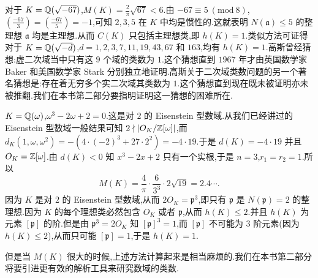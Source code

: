 \begin{example}
对于 $K=\mathbb{Q}(\sqrt{-67})$,$M(K)=\frac{2}{\pi}\sqrt{67}<6$.由 $-67\equiv 5\ (\mathrm{mod}\ 8)$,$\left(\frac{-67}{3}\right)=\left(\frac{-67}{5}\right)=-1$,可知 $2,3,5$ 在 $K$ 中均是惯性的.这就表明 $N(\mathfrak{a})\leqslant 5$ 的整理想 $\mathfrak{a}$ 均是主理想.从而 $C(K)$ 只包括主理想类,即 $h(K)=1$.类似方法可证得对于 $K=\mathbb{Q}(\sqrt{-d})$,$d=1,2,3,7,11,19,43,67$ 和 $163$,均有 $h(K)=1$.高斯曾经猜想:虚二次域当中只有这 $9$ 个域的类数为 $1$.这个猜想直到 $1967$ 年才由英国数学家 Baker 和美国数学家 Stark 分别独立地证明.高斯关于二次域类数问题的另一个著名猜想是:存在着无穷多个实二次域其类数为 $1$.这个猜想直到现在既未被证明亦未被推翻.我们在本书第二部分要指明证明这一猜想的困难所在.
\end{example}

\begin{example}\label{ex:ch3-s1-3-3}
$K=\mathbb{Q}(\omega)$,$\omega^3-2\omega+2=0$.这是对 $2$ 的 Eisenstein 型数域.从我们已经讲过的 Eisenstein 型数域一般结果可知 $2\nmid|O_K/\mathbb{Z}[\omega]|$,而 $d_K(1,\omega,\omega^2)=-(4\cdot(-2)^3+27\cdot 2^2)=-4\cdot 19$.于是 $d(K)=-4\cdot 19$ 并且 $O_K=\mathbb{Z}[\omega]$.由 $d(K)<0$ 知 $x^3-2x+2$ 只有一个实根,于是 $n=3$,$r_1=r_2=1$.所以
\[
  M(K)=\frac{4}{\pi}\cdot\frac{6}{3^3}\cdot 2\sqrt{19}=2.4\cdots.
\]
因为 $K$ 是对 $2$ 的 Eisenstein 型数域,从而 $2O_K=\mathfrak{p}^3$,即只有 $\mathfrak{p}$ 是 $N(\mathfrak{p})=2$ 的整理想.因为 $K$ 的每个理想类必然包含 $O_K$ 或者 $\mathfrak{p}$,从而 $h(K)\leqslant 2$.并且 $h(K)$ 为元素 $[\mathfrak{p}]$ 的阶.但是由 $\mathfrak{p}^3=2O_K$ 知 $[\mathfrak{p}]^3=1$,而 $[\mathfrak{p}]$ 不可能为 $3$ 阶元素(因为 $h(K)\leqslant 2$),从而只可能 $[\mathfrak{p}]=1$,于是 $h(K)=1$.
\end{example}

但是当 $M(K)$ 很大的时候,上述方法计算起来是相当麻烦的.我们在本书第二部分将要引进更有效的解析工具来研究数域的类数.

